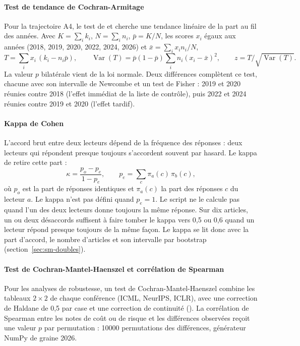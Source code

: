 \paragraph{Test de tendance de Cochran-Armitage}
Pour la trajectoire A4, le test de \textcite{cochran1954some} et \textcite{armitage1955tests} cherche
une tendance linéaire de la part au fil des années. Avec $K = \sum_i k_i$, $N = \sum_i n_i$,
$\bar{p} = K / N$, les scores $x_i$ égaux aux années (2018, 2019, 2020, 2022, 2024, 2026) et
$\bar{x} = \sum_i x_i n_i / N$,
\begin{equation}
  T = \sum_i x_i\,(k_i - n_i \bar{p}),
  \qquad
  \operatorname{Var}(T) = \bar{p}(1 - \bar{p}) \sum_i n_i (x_i - \bar{x})^2,
  \qquad
  z = T / \sqrt{\operatorname{Var}(T)}.
\end{equation}
La valeur $p$ bilatérale vient de la loi normale. Deux différences complètent ce test, chacune avec
son intervalle de Newcombe et un test de Fisher : 2019 et 2020 réunies contre 2018 (l'effet immédiat de la liste de contrôle), puis
2022 et 2024 réunies contre 2019 et 2020 (l'effet tardif).

\paragraph{Kappa de Cohen}
L'accord brut entre deux lecteurs dépend de la fréquence des réponses : deux lecteurs qui répondent
presque toujours  s'accordent souvent par hasard. Le kappa de \textcite{cohen1960coefficient}
retire cette part :
\begin{equation}
  \kappa = \frac{p_o - p_e}{1 - p_e},
  \qquad
  p_e = \sum_c \pi_a(c)\, \pi_b(c),
\end{equation}
où $p_o$ est la part de réponses identiques et $\pi_a(c)$ la part des réponses $c$ du lecteur $a$. Le
kappa n'est pas défini quand $p_e = 1$. Le script  ne le calcule pas quand l'un des deux
lecteurs donne toujours la même réponse. Sur dix articles, un ou deux désaccords suffisent à faire tomber le
kappa vers 0,5 ou 0,6 quand un lecteur répond presque toujours de la même façon. Le kappa se lit donc avec la part
d'accord, le nombre d'articles et son intervalle par bootstrap (section~\ref{sec:sm-doubles}).

\paragraph{Test de Cochran-Mantel-Haenszel et corrélation de Spearman}
Pour les analyses de robustesse, un test de Cochran-Mantel-Haenszel \parencite{mantel1959statistical}
combine les tableaux $2 \times 2$ de chaque conférence (ICML, NeurIPS, ICLR), avec une correction de
Haldane de 0,5 par case et une correction de continuité
(). La corrélation de Spearman entre les
notes de coût ou de risque et les différences observées reçoit une valeur $p$ par permutation : \num{10000}
permutations des différences, générateur NumPy de graine 2026.

